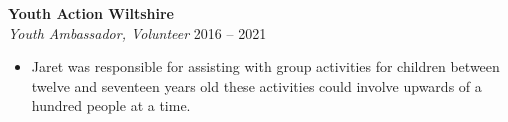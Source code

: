 \noindent
\textbf{Youth Action Wiltshire}\\
\textit{Youth Ambassador, Volunteer} \hfill 2016 – 2021
\begin{itemize}
    \item Jaret was responsible for assisting with group activities for children between twelve and seventeen years old these activities could involve upwards of a hundred people at a time.
\end{itemize}

